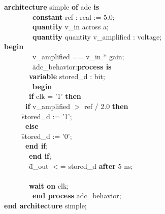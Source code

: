 {\small
\begin{tabbing}
\ \ \ \= \textbf{architecture} simple \textbf{of} adc \textbf{is} \\
\> \ \ \ \ \ \ \ \ \ \ \ \= \textbf{constant} ref : real := 5.0; \\
\> \ \ \ \ \ \ \ \ \ \ \ \= \textbf{quantity} v\_in across a; \\
\> \ \ \ \ \ \ \ \ \ \ \ \= \textbf{quantity} quantity v\_amplified : voltage; \\
\ \ \ \= \textbf{begin} \\
\> \ \ \ \ \ \ \ \ \ \ \ \= v\_amplified == v\_in * gain; \\
\> \ \ \ \ \ \ \ \ \ \ \ \= adc\_behavior:\textbf{process is} \\
\> \> \ \ \ \ \ \ \ \ \ \ \= \textbf{variable} stored\_d : bit; \\
\> \ \ \ \ \ \ \ \ \ \ \ \= \textbf{begin} \\
\> \> \ \ \ \ \ \ \ \ \ \ \= \textbf{if} clk = '1' \textbf{then} \\
\> \> \> \ \ \ \ \ \ \ \ \ \= \textbf{if} v\_amplified $>$ ref / 2.0 \textbf{then} \\
\> \> \> \> \ \ \ \ \ \ \ \ \= stored\_d := '1'; \\
\> \> \> \ \ \ \ \ \ \ \ \ \= \textbf{else} \\
\> \> \> \> \ \ \ \ \ \ \ \ \= stored\_d := '0'; \\
\> \> \> \ \ \ \ \ \ \ \ \ \= \textbf{end if}; \\
\> \> \ \ \ \ \ \ \ \ \ \ \=\textbf{end if};\\
\> \> \ \ \ \ \ \ \ \ \ \ \= d\_out $<$= stored\_d \textbf{after} 5 ns;\\ \\
\> \> \ \ \ \ \ \ \ \ \ \ \= \textbf{wait on} clk;\\
\> \ \ \ \ \ \ \ \ \ \ \ \= \textbf{end process} adc\_behavior;\\
\ \ \ \= \textbf{end architecture} simple;
\end{tabbing}
}





